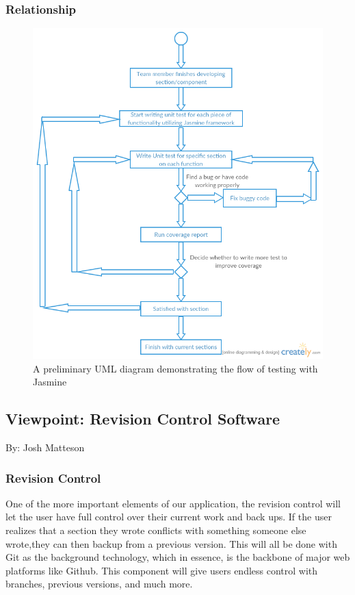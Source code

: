 \documentclass[onecolumn, draftclsnofoot,10pt, compsoc]{IEEEtran}
\begin{document}
\subsubsection{Relationship}
\begin{figure}[ht!]
\centering
\includegraphics[width=120mm]{Testing.png}
\caption{A preliminary UML diagram demonstrating the flow of testing with Jasmine}
\end{figure}

\newpage
\subsection{Viewpoint: Revision Control Software}
{\noindent By: Josh Matteson \par}

\subsubsection{Revision Control}
\noindent One of the more important elements of our application, the revision 
control will let the user have full control over their current work and back 
ups. If the user realizes that a section they wrote conflicts with something 
someone else wrote,they can then backup from a previous version. This will all 
be done with Git as the background technology, which in essence, is the 
backbone of major web platforms like Github. This component will give users 
endless control with branches, previous versions, and much more. \\
\end{document}
